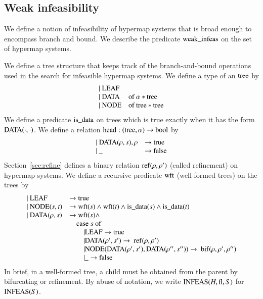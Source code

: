 \subsection{Weak infeasibility}
\label{sec:weak}

We define a notion of infeasibility of  hypermap systems that is
broad enough to encompass branch and bound.  We describe the
predicate ${\operatorname{weak\_infeas}}$ on the set of hypermap systems.

We define a tree structure that keeps track of the
branch-and-bound operations used in the search for infeasible
hypermap systems.  We define a type of an ${\operatorname{tree}}$ by
    $$
    \begin{array}{lll}
    |\ {\operatorname{LEAF}}&\\
    |\ {\operatorname{DATA}} &\text{of } \alpha * {\operatorname{tree}}\\
    |\ {\operatorname{NODE}} &\text{of } {\operatorname{tree}} * {\operatorname{tree}}\\
    \end{array}
    $$
%
We define a predicate ${\operatorname{is\_data}}$ on trees which is true
exactly when it has the form ${\operatorname{DATA}}(\cdot,\cdot)$. We define a
relation ${\operatorname{head}}:({\operatorname{tree}},\alpha)\to \operatorname{bool}$ by
    $$
    \begin{array}{lll}
    |\ {\operatorname{DATA}}(\rho,s),\rho &\to {\operatorname{true}}\\
    |\  {\operatorname{\_}} &\to {\operatorname{false}}
    \end{array}
    $$
Section~\ref{sec:refine} defines a binary relation
${\operatorname{ref}}(\rho,\rho')$ (called refinement) on hypermap systems. We
define a recursive predicate ${\operatorname{wft}}$ (well-formed trees) on the
trees by
    $$
    \begin{array}{lll}
    |\ {\operatorname{LEAF}} &\to{\operatorname{true}}\\
    |\ {\operatorname{NODE}}(s,t) &\to {\operatorname{wft}}(s) \wedge {\operatorname{wft}}(t)
    \wedge {\operatorname{is\_data}}(s) \wedge {\operatorname{is\_data}}(t)\\
    |\ {\operatorname{DATA}}(\rho,s) &\to {\operatorname{wft}}(s) \wedge\\
        &\quad \text{case}\ s\ \text{of}\\
        &\qquad|{\operatorname{LEAF}}\to{\operatorname{true}}\\
        &\qquad|{\operatorname{DATA}}(\rho',s')\to \ {\operatorname{ref}}(\rho,\rho')\\
        &\qquad|{\operatorname{NODE}}({\operatorname{DATA}}(\rho',s'),{\operatorname{DATA}}(\rho'',s''))\to
        \ {\operatorname{bif}}(\rho,\rho',\rho'')\\
        &\qquad|{\operatorname{\_}} \to {\operatorname{false}}\\
    \end{array}
    $$
In brief, in a well-formed tree, a child must be obtained from the
parent by bifurcating or refinement.
%
By abuse of notation, we write ${\operatorname{INFEAS}}(H,{\operatorname{fl}},S)$ for
${\operatorname{INFEAS}}(S)$.

